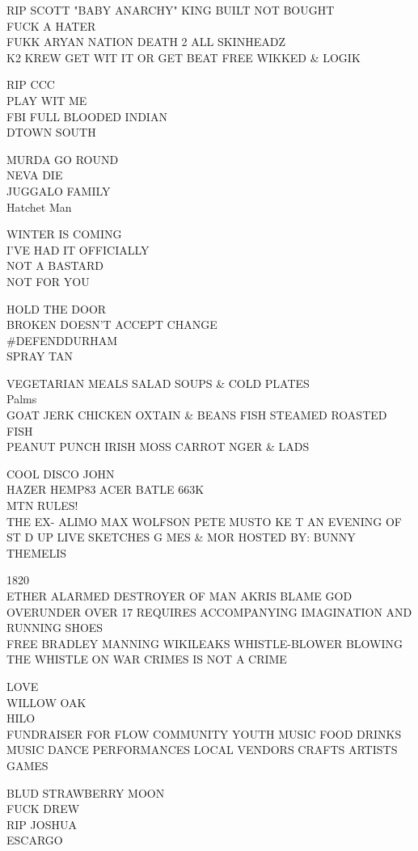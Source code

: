 \documentclass[10pt,letterpaper]{article}
\begin{document}
RIP SCOTT "BABY ANARCHY" KING BUILT NOT BOUGHT\\
FUCK A HATER\\
FUKK ARYAN NATION DEATH 2 ALL SKINHEADZ\\
K2 KREW GET WIT IT OR GET BEAT FREE WIKKED \& LOGIK

RIP CCC\\
PLAY WIT ME\\
FBI FULL BLOODED INDIAN\\
DTOWN SOUTH

MURDA GO ROUND\\
NEVA DIE\\
JUGGALO FAMILY\\
Hatchet Man

WINTER IS COMING\\
I'VE HAD IT OFFICIALLY\\
NOT A BASTARD\\
NOT FOR YOU

HOLD THE DOOR\\
BROKEN DOESN'T ACCEPT CHANGE\\
\#DEFENDDURHAM\\
SPRAY TAN

VEGETARIAN MEALS SALAD SOUPS \& COLD PLATES\\
Palms\\
GOAT JERK CHICKEN OXTAIN \& BEANS FISH STEAMED ROASTED FISH\\
PEANUT PUNCH IRISH MOSS CARROT NGER \& LADS

COOL DISCO JOHN\\
HAZER HEMP83 ACER BATLE 663K\\
MTN RULES!\\
THE EX{-} ALIMO MAX WOLFSON PETE MUSTO KE T AN EVENING OF ST D UP LIVE SKETCHES G MES \& MOR HOSTED BY: BUNNY THEMELIS

1820\\
ETHER ALARMED DESTROYER OF MAN AKRIS BLAME GOD\\
OVERUNDER OVER 17 REQUIRES ACCOMPANYING IMAGINATION AND RUNNING SHOES\\
FREE BRADLEY MANNING WIKILEAKS WHISTLE{-}BLOWER BLOWING THE WHISTLE ON WAR CRIMES IS NOT A CRIME

LOVE\\
WILLOW OAK\\
HILO\\
FUNDRAISER FOR FLOW COMMUNITY YOUTH MUSIC FOOD DRINKS MUSIC DANCE PERFORMANCES LOCAL VENDORS CRAFTS ARTISTS GAMES

BLUD STRAWBERRY MOON\\
FUCK DREW\\
RIP JOSHUA\\
ESCARGO
\end{document}
